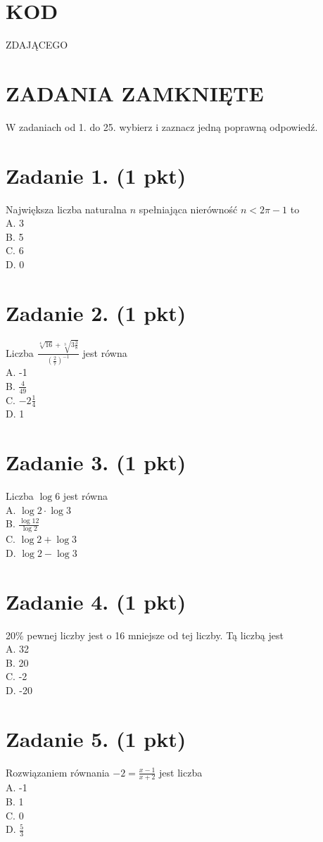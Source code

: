 \documentclass[10pt]{article}
\begin{document}
\section*{KOD}
ZDAJĄCEGO

\section*{ZADANIA ZAMKNIĘTE}
W zadaniach od 1. do 25. wybierz i zaznacz jedną poprawną odpowiedź.

\section*{Zadanie 1. (1 pkt)}
Największa liczba naturalna \(n\) spełniająca nierówność \(n<2 \pi-1\) to\\
A. 3\\
B. 5\\
C. 6\\
D. 0

\section*{Zadanie 2. (1 pkt)}
Liczba \(\frac{\sqrt[4]{16}+\sqrt[3]{3 \frac{3}{8}}}{\left(\frac{2}{7}\right)^{-1}}\) jest równa\\
A. -1\\
B. \(\frac{4}{49}\)\\
C. \(-2 \frac{1}{4}\)\\
D. 1

\section*{Zadanie 3. (1 pkt)}
Liczba \(\log 6\) jest równa\\
A. \(\log 2 \cdot \log 3\)\\
B. \(\frac{\log 12}{\log 2}\)\\
C. \(\log 2+\log 3\)\\
D. \(\log 2-\log 3\)

\section*{Zadanie 4. (1 pkt)}
20\% pewnej liczby jest o 16 mniejsze od tej liczby. Tą liczbą jest\\
A. 32\\
B. 20\\
C. -2\\
D. -20

\section*{Zadanie 5. (1 pkt)}
Rozwiązaniem równania \(-2=\frac{x-1}{x+2}\) jest liczba\\
A. -1\\
B. 1\\
C. 0\\
D. \(\frac{5}{3}\)
\end{document}

